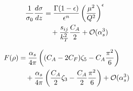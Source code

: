 \begin{align}
  \frac{1}{\sigma_0} \frac{d\sigma}{dz} &= \frac{\Gamma(1-\epsilon)}{\epsilon^{n}} \left(\frac{\mu^2}{Q^2}\right)^{\epsilon} \nonumber \\
  &\quad + \frac{s_{ij}}{k_T^2} \frac{C_A}{2} + \mathcal{O}(\alpha_s^3) \label{eq:4}
\end{align}

\begin{align}
  F(\rho) &= \frac{\alpha_s}{4\pi} \left( (C_A - 2C_F) \zeta_{5} - C_A \frac{\pi^2}{6} \right) \nonumber \\
  &\quad + \frac{\alpha_s}{4\pi} \left( \frac{C_A}{2} \zeta_{3} - \frac{C_A}{2} \frac{\pi^2}{6} \right) + \mathcal{O}(\alpha_s^3) \label{eq:5}
\end{align}

